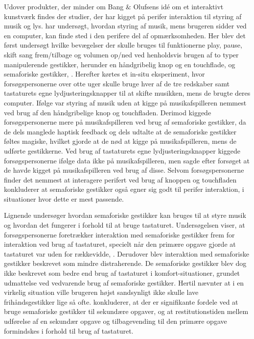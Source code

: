 Udover produkter, der minder om Bang $\&$ Olufsens idé om et interaktivt kunstværk findes der studier, der har kigget på perifer interaktion til styring af musik og lys. \textcite[s. 162]{PDF:ComparingInputModalities} har undersøgt, hvordan styring af musik, mens brugeren sidder ved en computer, kan finde sted i den perifere del af opmærksomheden. Her blev det først undersøgt hvilke bevægelser der skulle bruges til funktionerne play, pause, skift sang frem/tilbage og volumen op/ned ved henholdsvis brugen af to typer manipulerende gestikker, herunder en håndgribelig knop og en touchflade, og semaforiske gestikker, \parencite[ss. 165-166]{PDF:ComparingInputModalities}. Herefter kørtes et in-situ eksperiment, hvor forsøgspersonerne over otte uger skulle bruge hver af de tre redskaber samt tastaturets egne lydjusteringsknapper til at skifte musikken, mens de brugte deres computer. Ifølge \textcite[ss. 172-173]{PDF:ComparingInputModalities} var styring af musik uden at kigge på musikafspilleren nemmest ved brug af den håndgribelige knop og touchfladen. Derimod kiggede forsøgspersonerne mere på musikafspilleren ved brug af semaforiske gestikker, da de dels manglede haptisk feedback og dels udtalte at de semaforiske gestikker føltes magiske, hvilket gjorde at de nød at kigge på musikafspilleren, mens de udførte gestikkerne. Ved brug af tastaturets egne lydjusteringsknapper kiggede forsøgspersonerne ifølge data ikke på musikafspilleren, men sagde efter forsøget at de havde kigget på musikafspilleren ved brug af disse. Selvom forsøgspersonerne finder det nemmest at interagere perifert ved brug af knoppen og touchfladen konkluderer \textcite[s. 177]{PDF:ComparingInputModalities} at semaforiske gestikker også egner sig godt til perifer interaktion, i situationer hvor dette er mest passende.

Lignende \textcite{PDF:ComparingInputModalities} undersøger \textcite{PDF:AStudyOnTheUseOfSemaphoricGestures} hvordan semaforiske gestikker kan bruges til at styre musik og hvordan det fungerer i forhold til at bruge tastaturet. Undersøgelsen viser, at forsøgspersonerne foretrækker interaktion med semaforiske gestikker frem for interaktion ved brug af tastaturet, specielt når den primære opgave gjorde at tastaturet var uden for rækkevidde, \parencite[s. 1963]{PDF:AStudyOnTheUseOfSemaphoricGestures}. Derudover blev interaktion med semaforiske gestikker beskrevet som mindre distraherende. De semaforiske gestikker blev dog ikke beskrevet som bedre end brug af tastaturet i komfort-situationer, grundet udmattelse ved vedvarende brug af semaforiske gestikker. Hertil nævnter \textcite[s. 1963]{PDF:AStudyOnTheUseOfSemaphoricGestures} at i en virkelig situation ville brugeren højst sandsynligt ikke skulle lave frihåndsgestikker lige så ofte. \textcite[s. 1964]{PDF:AStudyOnTheUseOfSemaphoricGestures} konkluderer, at der er signifikante fordele ved at bruge semaforiske gestikker til sekundære opgaver, og at restitutionstiden mellem udførelse af en sekundær opgave og tilbagevending til den primære opgave formindskes i forhold til brug af tastaturet.

